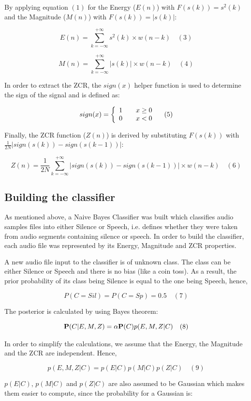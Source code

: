 \documentclass{article}
\begin{document}
By applying equation \((1)\) for the Energy (\(E(n)\)) with \(F(s(k)) = s^2(k)\) and the Magnitude (\(M(n)\)) with \(F(s(k)) = |s(k)|\):

\[
  E(n) = \sum_{k=-\infty}^{+\infty} s^2(k) \times w(n-k) \quad (3)
\]

\[
  M(n) = \sum_{k=-\infty}^{+\infty} |s(k)| \times w(n-k) \quad (4)
\]

In order to extract the ZCR, the \(sign(x)\) helper function is used to determine the sign of the signal and is defined as:

\[
  sign(x) = \left\{
    \begin{array}{l l}
      1 & \quad x \geq 0 \\
      0 & \quad x < 0
    \end{array} \right. \quad (5)
\]

Finally, the ZCR function (\(Z(n)\)) is derived by substituting \(F(s(k))\) with \(\frac{1}{2N}|sign(s(k)) - sign(s(k-1))|\):

\[
  Z(n) = \frac{1}{2N} \sum_{k=-\infty}^{+\infty} |sign(s(k)) - sign(s(k-1))| \times w(n-k) \quad (6)
\]

\subsection{Building the classifier}

As mentioned above, a Naive Bayes Classifier was built which classifies audio samples files into either Silence or Speech, i.e. defines whether they were taken from audio segments containing silence or speech.
In order to build the classifier, each audio file was represented by its Energy, Magnitude and ZCR properties.

A new audio file input to the classifier is of unknown class.
The class can be either Silence or Speech and there is no bias (like a coin toss).
As a result, the prior probability of its class being Silence is equal to the one being Speech, hence,

\[
  P(C=Sil) = P(C=Sp) = 0.5 \quad (7)
\]

The posterior is calculated by using Bayes theorem:

\[
  {\bf P}(C|E,M,Z) = \alpha{\bf P}(C)p(E,M,Z|C) \quad (8)
\]

In order to simplify the calculations, we assume that the Energy, the Magnitude and the ZCR are independent. Hence,

\[
  p(E,M,Z|C) = p(E|C)p(M|C)p(Z|C) \quad (9)
\]

\(p(E|C)\), \(p(M|C)\) and \(p(Z|C)\) are also assumed to be Gaussian which makes them easier to compute, since the probability for a Gaussian is:
\end{document}
